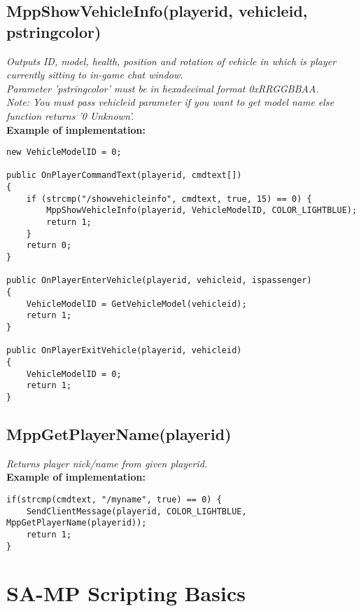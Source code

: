 \documentclass{article}
\begin{document}
\subsection{MppShowVehicleInfo(playerid, vehicleid, pstringcolor)}
\textit{Outputs ID, model, health, position and rotation of vehicle in which is player currently sitting to in-game chat window.
\\Parameter 'pstringcolor' must be in hexadecimal format 0xRRGGBBAA.
\\Note: You must pass vehicleid parameter if you want to get model name else function returns '0 Unknown'.}
\bigskip
\\\textbf{Example of implementation:}
\begin{verbatim}
new VehicleModelID = 0;

public OnPlayerCommandText(playerid, cmdtext[])
{
    if (strcmp("/showvehicleinfo", cmdtext, true, 15) == 0) {
        MppShowVehicleInfo(playerid, VehicleModelID, COLOR_LIGHTBLUE);
        return 1;
    }
    return 0;
}

public OnPlayerEnterVehicle(playerid, vehicleid, ispassenger)
{
    VehicleModelID = GetVehicleModel(vehicleid);
    return 1;
}

public OnPlayerExitVehicle(playerid, vehicleid)
{
    VehicleModelID = 0;
    return 1;
}
\end{verbatim}


\subsection{MppGetPlayerName(playerid)}
\textit{Returns player nick/name from given playerid.}
\bigskip
\\\textbf{Example of implementation:}
\begin{verbatim}
if(strcmp(cmdtext, "/myname", true) == 0) {
    SendClientMessage(playerid, COLOR_LIGHTBLUE, MppGetPlayerName(playerid));
    return 1;
}
\end{verbatim}


\newpage
\section{SA-MP Scripting Basics}
\end{document}
